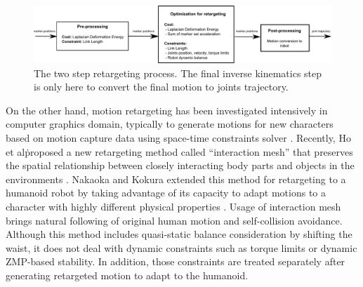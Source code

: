 \documentclass[letterpaper, 10 pt, conference]{ieeeconf}  %
\begin{document}
%

\begin{figure}[b]
  \includegraphics[width=\linewidth]{figure/architecture.pdf}
  \caption{The two step retargeting process. The final inverse
    kinematics step is only here to convert the final motion to joints
    trajectory.}
  \label{fig:algorithm}
\end{figure}


On the other hand, motion retargeting has been investigated
intensively in computer graphics domain, typically to generate motions
for new characters based on motion capture data using space-time
constraints solver \cite{Gleicher98}.  Recently, Ho et al\. proposed a
new retargeting method called ``interaction mesh'' that preserves the
spatial relationship between closely interacting body parts and
objects in the environments \cite{Komura10}.  Nakaoka and Kokura
extended this method for retargeting to a humanoid robot by taking
advantage of its capacity to adapt motions to a character with highly
different physical properties \cite{Nakaoka12Humanoids}. Usage of
interaction mesh brings natural following of original human motion and
self-collision avoidance.  Although this method includes quasi-static
balance consideration by shifting the waist, it does not deal with
dynamic constraints such as torque limits or dynamic ZMP-based
stability. In addition, those constraints are treated separately after
generating retargeted motion to adapt to the humanoid.
\end{document}
